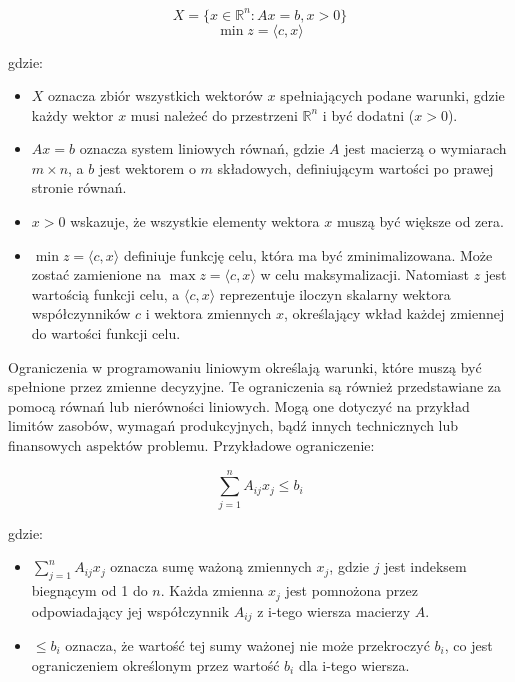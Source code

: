 \[
X = \{ x \in \mathbb{R}^n : Ax = b, x > 0 \}
\]
\[
\min z = \langle c, x \rangle
\]

gdzie:
\begin{itemize}
    \item \( X \) oznacza zbiór wszystkich wektorów \( x \) spełniających podane warunki, gdzie każdy wektor \( x \) musi należeć do przestrzeni \( \mathbb{R}^n \) i być dodatni (\( x > 0 \)).
    \item \( Ax = b \) oznacza system liniowych równań, gdzie \( A \) jest macierzą o wymiarach \( m \times n \), a \( b \) jest wektorem o \( m \) składowych, definiującym wartości po prawej stronie równań.
    \item \( x > 0 \) wskazuje, że wszystkie elementy wektora \( x \) muszą być większe od zera.
    \item \( \min z = \langle c, x \rangle \) definiuje funkcję celu, która ma być zminimalizowana. Może zostać zamienione na \( \max z = \langle c, x \rangle \) w celu maksymalizacji. Natomiast \( z \) jest wartością funkcji celu, a \( \langle c, x \rangle \) reprezentuje iloczyn skalarny wektora współczynników \( c \) i wektora zmiennych \( x \), określający wkład każdej zmiennej do wartości funkcji celu.
\end{itemize}

\par Ograniczenia w programowaniu liniowym określają warunki, które muszą być spełnione przez zmienne decyzyjne. Te ograniczenia są również przedstawiane za pomocą równań lub nierówności liniowych. Mogą one dotyczyć na przykład limitów zasobów, wymagań produkcyjnych, bądź innych technicznych lub finansowych aspektów problemu. Przykładowe ograniczenie:

\[
\sum_{j=1}^{n} A_{ij} x_j \leq b_i
\]

gdzie:
\begin{itemize}
    \item \( \sum_{j=1}^{n} A_{ij} x_j \) oznacza sumę ważoną zmiennych \( x_j \), gdzie \( j \) jest indeksem biegnącym od 1 do \( n \). Każda zmienna \( x_j \) jest pomnożona przez odpowiadający jej współczynnik \( A_{ij} \) z i-tego wiersza macierzy \( A \).
    \item \( \leq b_i \) oznacza, że wartość tej sumy ważonej nie może przekroczyć \( b_i \), co jest ograniczeniem określonym przez wartość \( b_i \) dla i-tego wiersza. 
\end{itemize}
    
